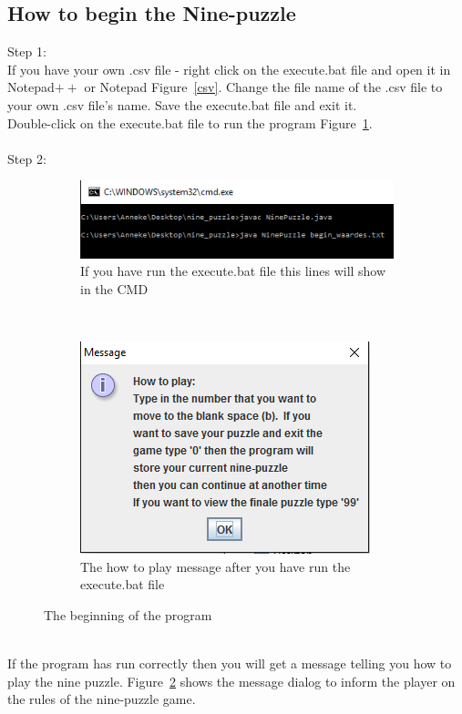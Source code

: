 \documentclass[10pt]{article}
\begin{document}
\subsection{How to begin the Nine-puzzle}
Step 1:
\\If you have your own .csv file - right click on the execute.bat file and open it in Notepad$++$ or Notepad Figure~\ref{csv}.
Change the file name of the .csv file to your own .csv file's name. Save the execute.bat file and exit it.
\\Double-click on the execute.bat file to run the program Figure~\ref{begincmd}. 
\\
\\Step 2:
\begin{figure}
  \centering
  \begin{subfigure}{0.5\textwidth}
    \centering
    \includegraphics[scale=0.8]{./Prente/begincmd.png}
    \caption{If you have run the execute.bat file this lines will show in the CMD }
    \label{begincmd}
  \end{subfigure}%
~ 
  \begin{subfigure}{0.5\textwidth}
    \centering
    \includegraphics[scale=0.8]{./Prente/MessageBegin.png}
    \caption{The how to play message after you have run the execute.bat file}
    \label{MessageBegin}
  \end{subfigure}
  \caption{The beginning of the program\label{1}}
  \end{figure}
\\If the program has run correctly then you will get a message telling you how to play the nine puzzle. Figure~\ref{MessageBegin} shows the message dialog to inform the player on the rules of the nine-puzzle game.
\end{document}
